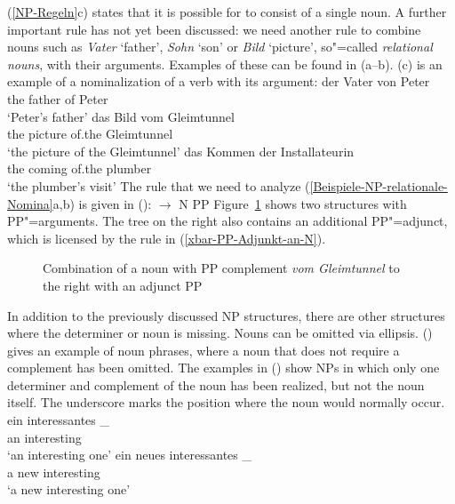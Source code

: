 (\ref{NP-Regeln}c) states that it is possible for \nbar to consist of a single noun. A further important rule has not yet been
discussed: we need another rule to combine nouns such as \emph{Vater} `father', \emph{Sohn} `son' or \emph{Bild} `picture', 
so"=called \emph{relational nouns}, with their arguments. Examples of these can be found in (a--b).
(c) is an example of a nominalization of a verb with its argument:
\eal
\label{Beispiele-NP-relationale-Nomina}
\ex 
\gll der Vater von Peter\\
	 the father of Peter\\
\glt `Peter's father'
\ex 
\gll das Bild vom Gleimtunnel\\
	 the picture of.the Gleimtunnel\\
\glt `the picture of the Gleimtunnel'
\ex 
\gll das Kommen der Installateurin\\
	 the coming of.the plumber\\
\glt `the plumber's visit'
\zl
\noindent
The rule that we need to analyze (\ref{Beispiele-NP-relationale-Nomina}a,b) is given in
():
\ea
\nbar $\to$ N PP
\z
%
Figure~\ref{Abbildung-NP-mit-PP-Argument} shows two structures with PP"=arguments. The tree on the right also contains an additional PP"=adjunct, which is licensed
by the rule in (\ref{xbar-PP-Adjunkt-an-N}).
\begin{figure}
\caption{\label{Abbildung-NP-mit-PP-Argument}Combination of a noun with PP complement
  \emph{vom Gleimtunnel} to the right with an adjunct PP}
\end{figure}%


In addition to the previously discussed NP structures, there are other structures where the determiner or noun is missing.
Nouns can be omitted via ellipsis. () gives an example of noun phrases, where a noun that does not require a complement
has been omitted. The examples in () show NPs in which only one determiner and complement of the noun has been realized,
but not the noun itself. The underscore marks the position where the noun would normally occur. 
\eal
\label{ex-nounless-np}
\ex 
\gll ein interessantes \_\\
     an  interesting\\
\glt `an interesting one'
\ex 
\gll ein neues interessantes \_\\
     a   new   interesting\\
\glt `a new interesting one'

